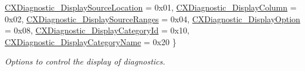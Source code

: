 \begin{DoxyCompactItemize}
\hyperlink{group__CINDEX__DIAG_gga0545c7c3ef36a397c44d142b0385b8d1a76bde2a9967db9f7338d407bad83700e}{C\+X\+Diagnostic\+\_\+\+Display\+Source\+Location} = 0x01, 
\hyperlink{group__CINDEX__DIAG_gga0545c7c3ef36a397c44d142b0385b8d1a6a94e17efbf896be95d99a1dc6708fc7}{C\+X\+Diagnostic\+\_\+\+Display\+Column} = 0x02, 
\hyperlink{group__CINDEX__DIAG_gga0545c7c3ef36a397c44d142b0385b8d1af46dbea10e55ecdc6a99d55f30813dcc}{C\+X\+Diagnostic\+\_\+\+Display\+Source\+Ranges} = 0x04, 
\hyperlink{group__CINDEX__DIAG_gga0545c7c3ef36a397c44d142b0385b8d1a79859f540b8fba954e0332ebd5eb3fdb}{C\+X\+Diagnostic\+\_\+\+Display\+Option} = 0x08, 
\newline
\hyperlink{group__CINDEX__DIAG_gga0545c7c3ef36a397c44d142b0385b8d1ab27a36f7c273ff376a52b71673eb404e}{C\+X\+Diagnostic\+\_\+\+Display\+Category\+Id} = 0x10, 
\hyperlink{group__CINDEX__DIAG_gga0545c7c3ef36a397c44d142b0385b8d1af0a8c2b64bc9a26a1cc336a2fa532056}{C\+X\+Diagnostic\+\_\+\+Display\+Category\+Name} = 0x20
 \}\begin{DoxyCompactList}\small\item\em Options to control the display of diagnostics. \end{DoxyCompactList}
\end{DoxyCompactItemize}
